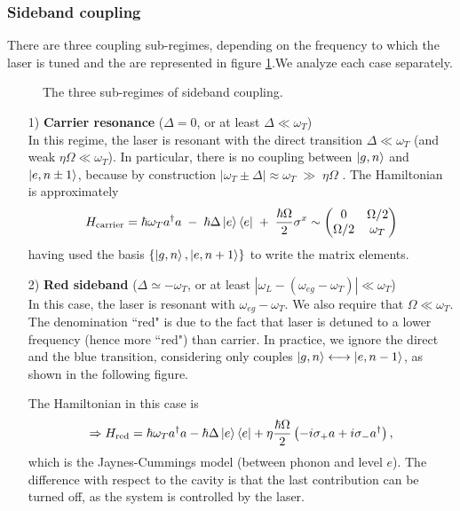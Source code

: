 \subsubsection{Sideband coupling}

There are three coupling sub-regimes, depending on the frequency to which the laser is tuned and the are represented in figure \ref{fig:sideband-coupling}.We analyze each case separately.
\begin{figure}[H]
    \centering
    
    \caption{The three sub-regimes of sideband coupling.}
    \label{fig:sideband-coupling}
\end{figure}


\begin{enumerate}
    \item[1)] \textbf{Carrier resonance} ($\Delta = 0$, or at least $\Delta \ll \omega_T$)\\
    In this regime, the laser is resonant with the direct transition $\Delta \ll \omega_T$ (and weak $\eta\Omega \ll \omega_T$). In particular, there is no coupling between $\ket{g,n}$ and $\ket{e, n\pm 1}$, because by construction $|\omega_T \pm \Delta| \approx \omega_T \;\gg\; \eta\Omega$ . The Hamiltonian is approximately
\begin{equation*}
H_\text{carrier} = \hbar\omega_Ta^\dag a
\;-\;
\hbar\Delta\ket{e}\bra{e}
\;+\;
\frac{\hbar\Omega}{2}\sigma^x 
\sim \begin{pmatrix}
0&\Omega/2 \\
\Omega/2&\omega_T
\end{pmatrix}
\end{equation*}
having used the basis $\{\ket{g,n}, \ket{e, n+1}\}$ to write the matrix elements.

\item[2)] \textbf{Red sideband} ($\Delta \simeq -\omega_T$, or at least $|\omega_L - (\omega_{eg}-\omega_T)| \ll \omega_T$) \\ 
In this case, the laser is resonant with $\omega_{eg} -\omega_T$. We also require that $\Omega \ll \omega_T$.
The denomination ``red" is due to the fact that laser is detuned to a lower frequency (hence more ``red") than carrier. In practice, we ignore the direct and the blue transition, considering only couples $\ket{g,n} \longleftrightarrow \ket{e, n-1}$, as shown in the following figure. 
\begin{center}
    
\end{center}
The Hamiltonian in this case is
\begin{equation*}
\Rightarrow H_{\text{red}} = \hbar\omega_Ta^\dag a
-
\hbar\Delta\ket{e}\bra{e}
+
\eta\frac{\hbar\Omega}{2}
\left(-i\sigma_+a+i\sigma_-a^\dag\right), 
\end{equation*}
which is the Jaynes-Cummings model (between phonon and level $e$). The difference with respect to the cavity is that the last contribution can be turned off, as the system is controlled by the laser.


\end{enumerate}
